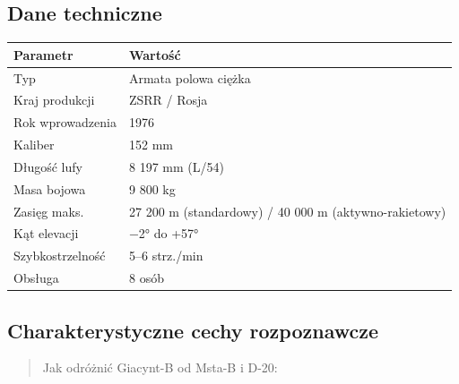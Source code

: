 \documentclass[12pt,oneside]{book}
\begin{document}
\subsection{Dane techniczne}\label{dane-techniczne-32}

\begin{longtable}[]{@{}ll@{}}
\toprule\noalign{}
Parametr & Wartość \\
\midrule\noalign{}
\endhead
\bottomrule\noalign{}
\endlastfoot
Typ & Armata polowa ciężka \\
Kraj produkcji & ZSRR / Rosja \\
Rok wprowadzenia & 1976 \\
Kaliber & 152 mm \\
Długość lufy & 8 197 mm (L/54) \\
Masa bojowa & 9 800 kg \\
Zasięg maks. & 27 200 m (standardowy) / 40 000 m (aktywno-rakietowy) \\
Kąt elevacji & −2° do +57° \\
Szybkostrzelność & 5--6 strz./min \\
Obsługa & 8 osób \\
\end{longtable}

\subsection{Charakterystyczne cechy
rozpoznawcze}\label{charakterystyczne-cechy-rozpoznawcze-32}

\begin{quote}
Jak odróżnić Giacynt-B od Msta-B i D-20:
\end{quote}
\end{document}

